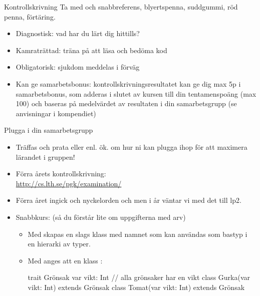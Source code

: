 


\begin{Slide}{Kontrollskrivning}
Ta med  och snabbreferens, blyertspenna, suddgummi, röd penna, förtäring.
\begin{itemize}
  \item Diagnostisk: vad har du lärt dig hittills?
  \item Kamraträttad: träna på att läsa och bedöma kod
  \item Obligatorisk: sjukdom  meddelas i förväg
  \item Kan ge samarbetsbonus: kontrollskrivningsresultatet kan ge dig max 5p i samarbetsbonus, som adderas i slutet av kursen till din tentamenspoäng (max 100) och baseras på medelvärdet av resultaten i din samarbetsgrupp (se anvisningar i kompendiet)
\end{itemize}
\end{Slide}

\begin{Slide}{Plugga i din samarbetsgrupp}
\begin{itemize}
\item Träffas och prata  eller enl. ök. om hur ni kan plugga ihop för att maximera lärandet i gruppen!
\pause
\item Förra årets kontrollskrivning: \\ \url{http://cs.lth.se/pgk/examination/}
\item Förra året ingick  och nyckelorden  och  men i år väntar vi med det till lp2.
\pause
\item Snabbkurs: (så du förstår lite om uppgifterna med arv)
\begin{itemize}\SlideFontSmall
\item Med  skapas en slags klass med namnet  som kan användas som bastyp i en hierarki av typer.
\item Med  anges att en klass  :
\begin{Code}
trait Grönsak { var vikt: Int }   // alla grönsaker har en vikt
class Gurka(var vikt: Int) extends Grönsak
class Tomat(var vikt: Int) extends Grönsak
\end{Code}
\end{itemize}


\end{itemize}
\end{Slide}
